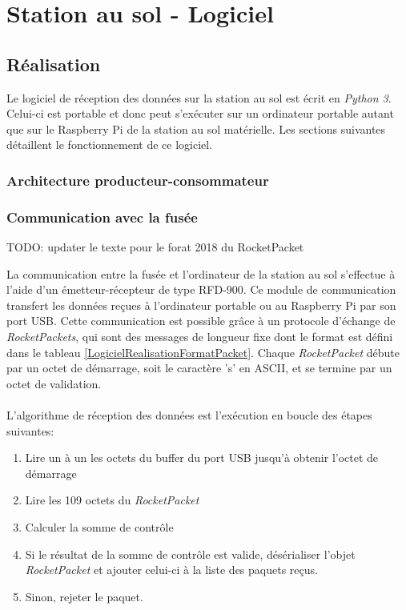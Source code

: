 \section{Station au sol - Logiciel}
\label{chap:sas}

\subsection{Réalisation}

Le logiciel de réception des données sur la station au sol est écrit en
\textit{Python 3}.
Celui-ci est portable et donc peut s'exécuter sur un
ordinateur portable autant que sur le Raspberry Pi de la station au sol
matérielle.
Les sections suivantes détaillent le fonctionnement de ce logiciel.

\subsubsection{Architecture producteur-consommateur}


\subsubsection{Communication avec la fusée}
TODO: updater le texte pour le forat 2018 du RocketPacket

La communication entre la fusée et l'ordinateur de la station au sol s'effectue à l'aide d'un émetteur-récepteur de type RFD-900. Ce module de communication transfert les données reçues à l'ordinateur portable ou au Raspberry Pi par son port USB. Cette communication est possible grâce à un protocole d'échange de \emph{RocketPackets}, qui sont des messages de longueur fixe dont le format est défini dans le tableau \ref{LogicielRealisationFormatPacket}. Chaque \emph{RocketPacket} débute par un octet de démarrage, soit le caractère 's' en ASCII, et se termine par un octet de validation.
\\ \\
L'algorithme de réception des données est l'exécution en boucle des étapes suivantes:

\begin{enumerate}
    \item Lire un à un les octets du buffer du port USB jusqu'à obtenir l'octet de démarrage
    \item Lire les 109 octets du \emph{RocketPacket}
    \item Calculer la somme de contrôle
    \item Si le résultat de la somme de contrôle est valide, désérialiser l'objet \emph{RocketPacket} et ajouter celui-ci à la liste des paquets reçus.
    \item Sinon, rejeter le paquet.
\end{enumerate}


